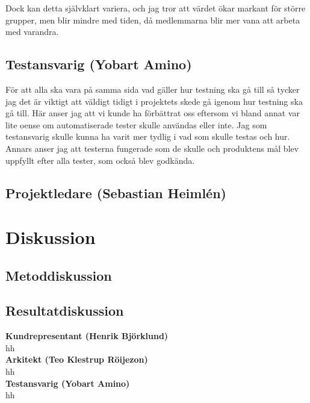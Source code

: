 \documentclass[conference,a4paper]{IEEEtran}
\begin{document}
Dock kan detta självklart variera, och jag tror att värdet ökar markant för större grupper, men blir mindre med tiden, då medlemmarna blir mer vana att arbeta med varandra.

\subsection{Testansvarig (Yobart Amino)}
För att alla ska vara på samma sida vad gäller hur testning ska gå till så tycker jag det är viktigt att väldigt tidigt i projektets skede gå igenom hur testning ska gå till. Här anser jag att vi kunde ha förbättrat oss eftersom vi bland annat var lite oense om automatiserade tester skulle användas eller inte. Jag som testansvarig skulle kunna ha varit mer tydlig i vad som skulle testas och hur. 
Annars anser jag att testerna fungerade som de skulle och produktens mål blev uppfyllt efter alla tester, som också blev godkända.

\subsection{Projektledare (Sebastian Heimlén)}

\section{Diskussion} \label{sec:disk}

\subsection{Metoddiskussion}

\subsection{Resultatdiskussion}

\noindent \textbf{Kundrepresentant (Henrik Björklund)}\\
hh
\\

\noindent \textbf{Arkitekt (Teo Klestrup Röijezon)}\\
hh
\\

\noindent \textbf{Testansvarig (Yobart Amino)}\\
hh
\\
\end{document}
